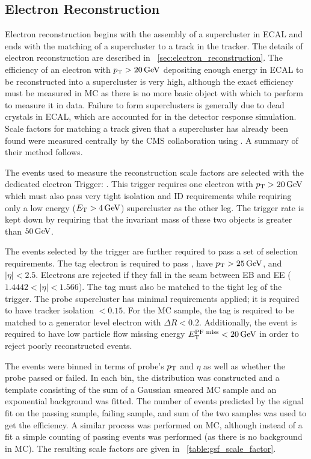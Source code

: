 
\subsection{Electron Reconstruction}
\label{ssec:sf_reconstruction}

Electron reconstruction begins with the assembly of a supercluster in ECAL and
ends with the matching of a supercluster to a track in the tracker. The details
of electron reconstruction are described in
\SEC~\ref{sec:electron_reconstruction}. The efficiency of an electron with $p_{\mathrm{T}}
> 20 \,\text{Ge\hspace{-.08em}V}$ depositing enough energy in ECAL to be reconstructed into a
supercluster is very high, although the exact efficiency must be measured in
MC as there is no more basic object with which to perform \TnP to measure it in
data. Failure to form superclusters is generally due to dead crystals in ECAL,
which are accounted for in the detector response simulation. Scale factors for
matching a track given that a supercluster has already been found were measured
centrally by the CMS collaboration using \TnP \cite{gsf_scale_factors_2013}. A
summary of their method follows.

The events used to measure the reconstruction scale factors are selected with the
dedicated electron \TnP Trigger: \TnPTrigger. This trigger requires one
electron with $p_{\mathrm{T}} > 20 \,\text{Ge\hspace{-.08em}V}$ which must also pass very tight isolation and ID
requirements while requiring only a low energy ($E_{\mathrm{T}} > 4 \,\text{Ge\hspace{-.08em}V}$) supercluster as
the other leg. The trigger rate is kept down by requiring that the invariant
mass of these two objects is greater than $50 \,\text{Ge\hspace{-.08em}V}$.

The events selected by the trigger are further required to pass a set of
selection requirements. The tag electron is required to pass \EGTIGHT, have
$p_{\mathrm{T}} > 25 \,\text{Ge\hspace{-.08em}V}$, and $|\eta| < 2.5$. Electrons are rejected if they fall in the
seam between EB and EE ($1.4442 < |\eta| < 1.566$). The tag must also be
matched to the tight leg of the \TnP trigger. The probe supercluster has
minimal requirements applied; it is required to have tracker isolation $<
0.15$. For the MC sample, the tag is required to be matched to a generator
level electron with $\Delta R < 0.2$. Additionally, the event is required to
have low particle flow missing energy $E_{\mathrm{T}}^{\text{PF miss}} < 20 \,\text{Ge\hspace{-.08em}V}$ in order to reject
poorly reconstructed events.

The events were binned in terms of probe's $p_{\mathrm{T}}$ and $\eta$ as well as whether
the probe passed or failed. In each bin, the \mee distribution was constructed
and a template consisting of the sum of a Gaussian smeared \Ztoee MC sample and
an exponential background was fitted. The number of events predicted by the
signal fit on the passing sample, failing sample, and sum of the two samples
was used to get the efficiency. A similar process was performed on MC, although
instead of a fit a simple counting of passing events was performed (as there is
no background in MC). The resulting scale factors are given in
\TAB~\ref{table:gsf_scale_factor}.

